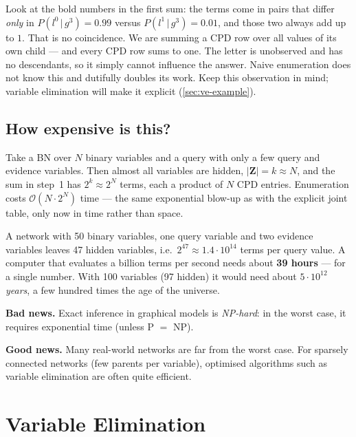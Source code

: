 \documentclass[11pt, oneside]{book}
\newcommand{\Prob}{\mathbb{P}}           %
\newcommand{\given}{\,\vert\,}           %
\newcommand{\bZ}{\mathbf{Z}}  \newcommand{\bE}{\mathbf{E}}
\let\originalsection\section
\renewcommand{\section}{\Needspace{7\baselineskip}\originalsection}
\let\originalsubsection\subsection
\renewcommand{\subsection}{\Needspace{6\baselineskip}\originalsubsection}
\begin{document}
Look at the bold numbers in the first sum: the terms come in pairs that differ
\emph{only} in $P(l^0 \given g^3) = 0.99$ versus $P(l^1 \given g^3) = 0.01$, and
those two always add up to $1$. That is no coincidence. We are summing a CPD
row over all values of its own child --- and every CPD row sums to one. The
letter is unobserved and has no descendants, so it simply cannot influence
the answer. Naive enumeration does not know this and dutifully doubles its
work. Keep this observation in mind; variable elimination will make it
explicit (\cref{sec:ve-example}).

\subsection{How expensive is this?}
\label{sec:enum-complexity}

Take a BN over $N$ binary variables and a query with only a few query and
evidence variables. Then almost all variables are hidden, $|\bZ| = k \approx
N$, and the sum in step~1 has $2^k \approx 2^N$ terms, each a product of $N$
CPD entries. Enumeration costs $\mathcal{O}(N \cdot 2^N)$ time --- the same
exponential blow-up as with the explicit joint table, only now in time rather
than space.

\begin{exbox}[title={What ``exponential'' means in seconds}]
A network with 50 binary variables, one query variable and two evidence
variables leaves 47 hidden variables, i.e.\ $2^{47} \approx 1.4 \cdot 10^{14}$
terms per query value. A computer that evaluates a billion terms per second
needs about \textbf{39 hours} --- for a single number. With 100 variables (97
hidden) it would need about $5 \cdot 10^{12}$ \emph{years}, a few hundred
times the age of the universe.
\end{exbox}

\begin{thmbox}[title={Complexity of exact inference}, unbreakable]
\textbf{Bad news.} Exact inference in graphical models is \emph{NP-hard}: in
the worst case, it requires exponential time (unless P $=$ NP).\par
\textbf{Good news.} Many real-world networks are far from the worst case. For
sparsely connected networks (few parents per variable), optimised algorithms
such as variable elimination are often quite efficient.
\end{thmbox}

\section{Variable Elimination}
\label{sec:ve}
\end{document}
